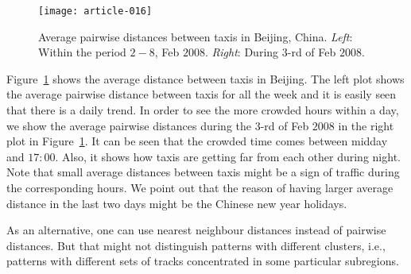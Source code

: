 \documentclass[article]{jss}
\begin{document}
\begin{figure}[!h]
\begin{center}
\texttt{[image: article-016]}
\end{center}
\caption{Average pairwise distances between taxis in Beijing, China. \emph{Left}: Within the period $2-8$, Feb $2008$. \emph{Right}: During $3$-rd of Feb $2008$.}
\label{distbijing}
\end{figure}

Figure~\ref{distbijing} shows the average distance between taxis in Beijing. The left plot shows the average pairwise distance between taxis for all the week and it is easily seen that there is a daily trend. In order to see the more crowded hours within a day, we show the average pairwise distances during the $3$-rd of Feb $2008$ in the right plot in Figure~\ref{distbijing}. It can be seen that the crowded time comes between midday and $17:00$. Also, it shows how taxis are getting far from each other during night. Note that small average distances between taxis might be a sign of traffic during the corresponding hours. We point out that the reason of having larger average distance in the last two days might be the Chinese new year holidays.

As an alternative, one can use nearest neighbour distances instead of pairwise distances. But that might not distinguish patterns with different clusters, i.e., patterns with different sets of tracks concentrated in some particular subregions. 
\end{document}
